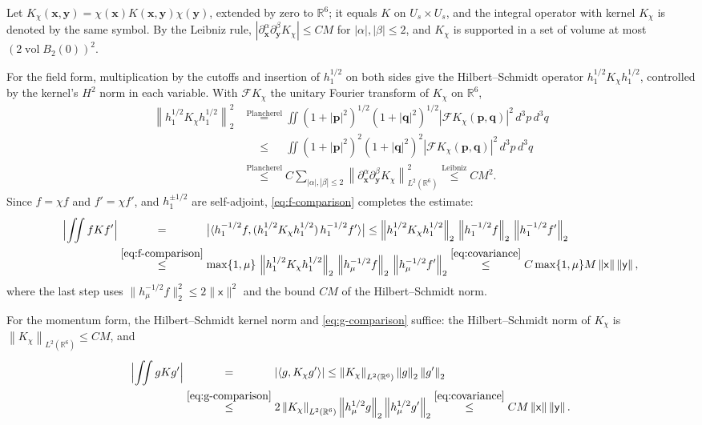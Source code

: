 \documentclass[11pt]{amsart}
\numberwithin{equation}{section}
\theoremstyle{definition}
\newcommand{\R}{\mathbb R}
\newcommand{\sx}{\mathsf x}
\newcommand{\sy}{\mathsf y}
\newcommand{\bx}{\mathbf x}
\newcommand{\by}{\mathbf y}
\newcommand{\bp}{\mathbf p}
\newcommand{\vol}{\operatorname{vol}}
\newcommand{\norm}[1]{\left\|#1\right\|}
\newcommand{\ip}[2]{\langle #1,#2\rangle}
\begin{document}
Let \(K_\chi(\bx,\by)=\chi(\bx)K(\bx,\by)\chi(\by)\), extended by zero
to \(\R^6\); it equals \(K\) on \(U_s\times U_s\), and the integral
operator with kernel \(K_\chi\) is denoted by the same symbol. By the
Leibniz rule, \(|\partial_\bx^\alpha\partial_\by^\beta K_\chi|\le CM\)
for \(|\alpha|,|\beta|\le2\), and \(K_\chi\) is supported in a set of
volume at most \((2\vol B_2(0))^2\).

For the field form, multiplication by the cutoffs and insertion of
\(h_1^{1/2}\) on both sides give the Hilbert--Schmidt operator
\(h_1^{1/2}K_\chi h_1^{1/2}\), controlled by the kernel's \(H^2\) norm
in each variable. With \(\mathcal FK_\chi\) the unitary Fourier
transform of \(K_\chi\) on \(\R^6\),
\begin{align*}
 \norm{h_1^{1/2}K_\chi h_1^{1/2}}_2^2
 &\overset{\text{Plancherel}}{=}
   \iint(1+|\bp|^2)^{1/2}(1+|\mathbf q|^2)^{1/2}
   |\mathcal FK_\chi(\bp,\mathbf q)|^2\,d^3p\,d^3q\\
 &\overset{\phantom{\text{Plancherel}}}{\le}\iint(1+|\bp|^2)^{2}(1+|\mathbf q|^2)^{2}
   |\mathcal FK_\chi(\bp,\mathbf q)|^2\,d^3p\,d^3q\\
 &\overset{\text{Plancherel}}{\le}C\sum_{|\alpha|,|\beta|\le2}
   \norm{\partial_\bx^\alpha\partial_\by^\beta K_\chi}_{L^2(\R^6)}^2
 \overset{\text{Leibniz}}{\le}CM^2 .
\end{align*}
Since \(f=\chi f\) and \(f'=\chi f'\), and \(h_1^{\pm1/2}\) are
self-adjoint, \eqref{eq:f-comparison} completes the estimate:
\begin{align*}
 \Bigl|\iint fKf'\Bigr|
 &\overset{\phantom{\eqref{eq:f-comparison}}}{=}\bigl|\ip{h_1^{-1/2}f}{(h_1^{1/2}K_\chi h_1^{1/2})\,h_1^{-1/2}f'}\bigr|
 \le\norm{h_1^{1/2}K_\chi h_1^{1/2}}_2\,
   \norm{h_1^{-1/2}f}_2\,\norm{h_1^{-1/2}f'}_2\\
 &\overset{\eqref{eq:f-comparison}}{\le}\max\{1,\mu\}\,
   \norm{h_1^{1/2}K_\chi h_1^{1/2}}_2\,
   \norm{h_\mu^{-1/2}f}_2\,\norm{h_\mu^{-1/2}f'}_2
 \overset{\eqref{eq:covariance}}{\le}C\max\{1,\mu\}M\norm{\sx}\norm{\sy},
\end{align*}
where the last step uses \(\lVert h_\mu^{-1/2}f\rVert_2^2\le2\lVert\sx\rVert^2\)
and the bound \(CM\) of the Hilbert--Schmidt norm.

For the momentum form, the Hilbert--Schmidt kernel norm and
\eqref{eq:g-comparison} suffice: the Hilbert--Schmidt norm of
\(K_\chi\) is \(\norm{K_\chi}_{L^2(\R^6)}\le CM\), and
\begin{align*}
 \Bigl|\iint gKg'\Bigr|
 &\overset{\phantom{\eqref{eq:g-comparison}}}{=}|\ip{g}{K_\chi g'}|
 \le\norm{K_\chi}_{L^2(\R^6)}\norm{g}_2\norm{g'}_2\\
 &\overset{\eqref{eq:g-comparison}}{\le}
   2\norm{K_\chi}_{L^2(\R^6)}\norm{h_\mu^{1/2}g}_2\norm{h_\mu^{1/2}g'}_2
 \overset{\eqref{eq:covariance}}{\le}CM\norm{\sx}\norm{\sy}.
\end{align*}
\end{document}
